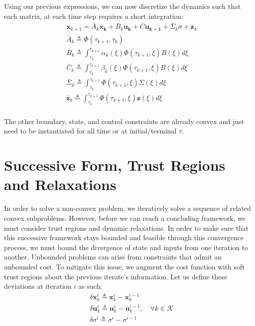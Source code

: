 Using our previous expressions, we can now discretize the dynamics such that each matrix, at each time step requires a short integration:
 \begin{align}
& \mathbf{x}_{k+1} = \bar{A}_k\mathbf{x_k} + \bar{B}_k\mathbf{u_k} + \bar{C}\mathbf{u_{k+1}} + \bar{\Sigma}_k\sigma + \bar{\mathbf{z}}_k  \\
& \bar{A}_k \triangleq  \Phi(\tau_{k+1},\tau_k)\\
& \bar{B}_k \triangleq \int_{\tau_k}^{\tau_{k+1}} \alpha_k(\xi) \Phi(\tau_{k+1},\xi) B(\xi) d\xi\\
& \bar{C}_k \triangleq \int_{\tau_k}^{\tau_{k+1}} \beta_k(\xi) \Phi(\tau_{k+1},\xi) B(\xi)  d\xi\\
& \bar{\Sigma}_k \triangleq \int_{\tau_k}^{\tau_{k+1}} \Phi(\tau_{k+1},\xi) \Sigma(\xi) d\xi\\
& \bar{\mathbf{z}}_k \triangleq \int_{\tau_k}^{\tau_{k+1}} \Phi(\tau_{k+1},\xi) \mathbf{z}(\xi) d\xi\\
\end{align}

The other boundary, state, and control constraints are already convex and just need to be instantiated for all time or at initial/terminal $\tau$.


\section{Successive Form, Trust Regions and Relaxations}
In order to solve a non-convex problem, we iteratively solve a sequence of related convex subproblems. However, before we can reach a concluding framework, we must consider trust regions and dynamic relaxations. In order to make sure that this successive framework stays bounded and feasible through this convergence process, we must bound the divergence of state and inputs from one iteration to another. Unbounded problems can arise from constraints that admit an unbounded cost. To mitigate this issue, we augment the cost function with soft trust regions about the previous iterate's information. Let us define these deviations at iteration $i$ as such:
\begin{align}
& \delta \mathbf{x}_k^i \triangleq \mathbf{x}_k^i - \mathbf{x}_k^{i-1} \\
& \delta \mathbf{u}_k^i \triangleq \mathbf{u}_k^i - \mathbf{u}_k^{i-1}, \quad \forall k \in \mathcal{K}\\
& \delta \sigma^i \triangleq \sigma^i - \sigma^{i-1}
\end{align}

